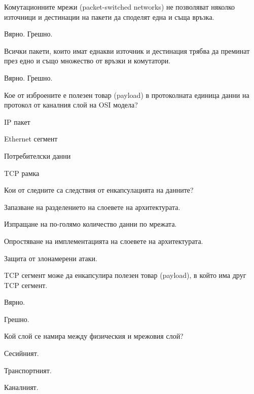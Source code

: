 \begin{questions}
  \question[6] Комутационните мрежи (\foreignlanguage{english}{packet-switched
    networks}) не позволяват няколко източници и дестинации на пакети да споделят
  една и съща връзка.
  \begin{oneparchoices}
    \choice Вярно.
    \CorrectChoice Грешно.
  \end{oneparchoices}

  \question[6] Всички пакети, които имат еднакви източник и дестинация трябва да
  преминат през едно и също множество от връзки и комутатори.
  \begin{oneparchoices}
    \choice Вярно.
    \CorrectChoice Грешно.
  \end{oneparchoices}

  \question[6] Кое от изброените е полезен товар
  (\foreignlanguage{english}{payload}) в протоколната единица данни на протокол
  от каналния слой на OSI модела?
  \begin{oneparchoices}
    \choice IP пакет

    \CorrectChoice Ethernet сегмент

    \choice Потребителски данни

    \choice TCP рамка
  \end{oneparchoices}

  \question[6] Кои от следните са следствия от енкапсулацията на данните?
  \begin{choices}
    \CorrectChoice Запазване на разделението на слоевете на архитектурата.

    \choice Изпращане на по-голямо количество данни по мрежата.

    \CorrectChoice Опростяване на имплементацията на слоевете на архитектурата.

    \choice Защита от злонамерени атаки.
  \end{choices}

  \question[6] TCP сегмент може да енкапсулира полезен товар
  (\foreignlanguage{english}{payload}), в който има друг TCP сегмент.
  \begin{oneparchoices}
    \CorrectChoice Вярно.

    \choice Грешно.
  \end{oneparchoices}

  \question[6] Кой слой се намира между физическия и мрежовия слой?
  \begin{oneparchoices}
    \choice Сесийният.

    \choice Транспортният.

    \CorrectChoice Каналният.


\end{oneparchoices}
\end{questions}
